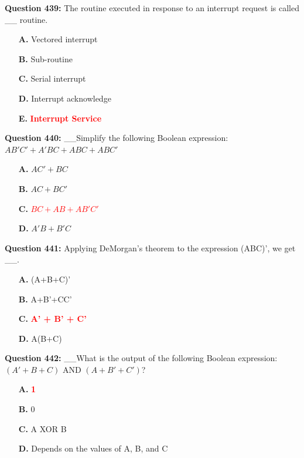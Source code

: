 \documentclass[12pt,a4paper]{article}
\begin{document}
\vspace{0.5cm}

\textbf{Question 439:} The routine executed in response to an interrupt request is called __ routine.

\begin{itemize}
    \item[\textbf{A.}] Vectored interrupt
    \item[\textbf{B.}] Sub-routine
    \item[\textbf{C.}] Serial interrupt
    \item[\textbf{D.}] Interrupt acknowledge
    \item[\textbf{E.}] \textcolor{red}{\textbf{Interrupt Service}}
\end{itemize}

\vspace{0.5cm}

\textbf{Question 440:} __Simplify the following Boolean expression: $AB'C' + A'BC + ABC + ABC'$

\begin{itemize}
    \item[\textbf{A.}] $AC' + BC$
    \item[\textbf{B.}] $AC + BC'$
    \item[\textbf{C.}] \textcolor{red}{\textbf{$BC + AB + AB'C'$}}
    \item[\textbf{D.}] $A'B + B'C$
\end{itemize}

\vspace{0.5cm}

\textbf{Question 441:} Applying DeMorgan's theorem to the expression (ABC)', we get __.

\begin{itemize}
    \item[\textbf{A.}] (A+B+C)'
    \item[\textbf{B.}] A+B'+CC'
    \item[\textbf{C.}] \textcolor{red}{\textbf{A' + B' + C'}}
    \item[\textbf{D.}] A(B+C)
\end{itemize}

\vspace{0.5cm}

\textbf{Question 442:} __What is the output of the following Boolean expression: $(A' + B + C)\text{ AND }(A + B' + C')$?

\begin{itemize}
    \item[\textbf{A.}] \textcolor{red}{\textbf{1}}
    \item[\textbf{B.}] 0
    \item[\textbf{C.}] A XOR B
    \item[\textbf{D.}] Depends on the values of A, B, and C
\end{itemize}
\end{document}
